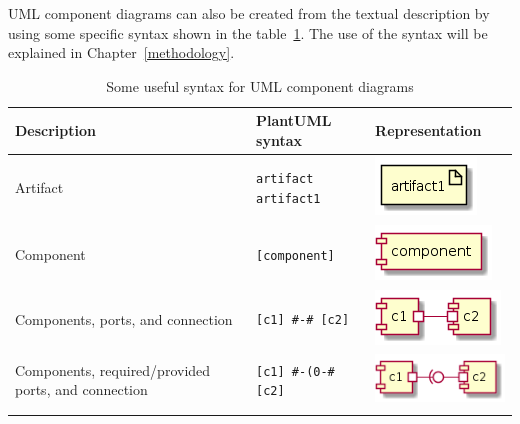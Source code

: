 UML component diagrams can also be created from the textual description by using some specific syntax shown in the table~\ref{table:plantuml_component_syntax}. The use of the syntax will be explained in Chapter~\ref{methodology}. 

\begin{longtable}{>{\centering}m{1.8in} >{\centering}m{2in} >{\centering\arraybackslash}m{1.5in}}
\toprule
\textbf{Description} & \textbf{PlantUML syntax} & \textbf{Representation} \\
\midrule
Artifact & \texttt{artifact artifact1} & \includegraphics[width=0.45\linewidth]{figure/plantuml_example/artifact.png} \\ \hline
Component & \texttt{[component]} & \includegraphics[width=0.6\linewidth]{figure/plantuml_example/component.png} \\ \hline
Components, ports, and connection &  \texttt{[c1] \#-\# [c2]} & \includegraphics[width=0.7\linewidth]{figure/plantuml_example/port.png}\\ \hline
Components, required/provided ports, and connection & \texttt{[c1] \#-(0-\# [c2]} & \includegraphics[width=0.8\linewidth]{figure/plantuml_example/port_type.png}\\
\bottomrule
\caption{Some useful syntax for UML component diagrams}
\label{table:plantuml_component_syntax}
\end{longtable}

